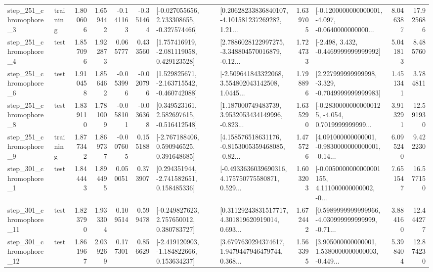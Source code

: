 \begin{tabular}{llrrrrllrlrr}
   step\_251\_chromophore\_3 &  training &      1.800606 &    1.659442 &     -0.141163 & -0.351464 &   [-0.027055656, 2.733308655, -0.327574466] &  [0.20628233836840107, -4.101581237269282, 1.21... &       1.639705 &  [-0.1200000000000001, -4.097, -0.0640000000000... &            8.046387 &         17.925686 \\
   step\_251\_chromophore\_4 &      test &      1.857096 &    1.922873 &      0.065777 &  0.433560 &    [1.757416919, -2.081119058, 0.429123528] &  [2.7886028122997275, -3.348804570016879, -0.12... &       1.724733 &               [-2.498, 3.432, -0.4469999999999992] &            5.041813 &          8.485760 \\
   step\_251\_chromophore\_6 &      test &      1.910458 &    1.856462 &     -0.053996 & -0.020796 &   [1.529825671, -2.163715542, -0.460742088] &  [-2.509641843322068, 3.554802043142508, 1.0445... &       1.798896 &   [2.227999999999998, -3.329, -0.7049999999999983] &            1.451341 &          3.784811 \\
   step\_251\_chromophore\_8 &      test &      1.839110 &    1.781009 &     -0.058101 & -0.036368 &    [0.349523161, 2.582697615, -0.516412548] &  [1.187000749483739, 3.9532053434149996, -0.823... &       1.635290 &  [-0.28300000000000125, -4.054, 0.7019999999999... &            3.913291 &         12.591930 \\
   step\_251\_chromophore\_9 &  training &      1.877342 &    1.869737 &     -0.007605 &  0.155188 &    [-2.767188406, 0.590946525, 0.391648685] &  [4.158576518631176, -0.8153005359468085, -0.82... &       1.475726 &  [4.091000000000001, -0.9830000000000001, -0.14... &            6.095240 &          9.422230 \\
   step\_301\_chromophore\_1 &      test &      1.844443 &    1.894495 &      0.050051 &  0.373907 &    [0.294351944, -2.741582651, 0.158485336] &  [-0.4933636039690316, 4.175750775580871, 0.529... &       1.603203 &  [-0.0050000000000001155, 4.111000000000002, -0... &            7.651547 &         16.577150 \\
  step\_301\_chromophore\_11 &      test &      1.823790 &    1.933304 &      0.109514 &  0.599478 &    [-0.249827623, 2.757650012, 0.380783727] &  [0.31129243831517717, 4.301819620919014, 0.693... &       1.672442 &  [0.5989999999999966, -4.030999999999999, -0.71... &            3.884160 &         12.444277 \\
  step\_301\_chromophore\_12 &      test &      1.861967 &    2.039269 &      0.177301 &  0.856629 &   [-2.419120903, -1.184822666, 0.153634237] &  [3.6797630294374617, 1.9479447946479744, 0.368... &       1.563395 &  [3.905000000000001, 1.5380000000000003, -0.449... &            5.398404 &         12.874230 \\

\end{tabular}
